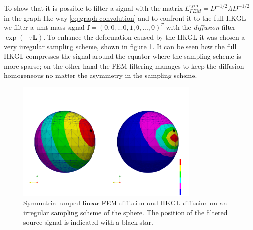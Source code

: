 To show that it is possible to filter a signal with the matrix $L_{FEM}^{\text{sym}} = D^{-1/2}AD^{-1/2}$ in the graph-like way \ref{eq:graph convolution} and to confront it to the full HKGL we filter a unit mass signal $\mathbf{f}=(0,0,...0,1,0,...,0)^T$ with the \textit{diffusion} filter $\exp{(-\tau \mathbf L)}$. To enhance the deformation caused by the HKGL it was chosen a very irregular sampling scheme, shown in figure \ref{fig:FEM lumped symmetric diffusion on irregular sampling}. It can be seen how the full HKGL compresses the signal around the equator where the sampling scheme is more sparse; on the other hand the FEM filtering manages to keep the diffusion homogeneous no matter the asymmetry in the sampling scheme. 
\begin{figure}[h!]
	\centering
	\includegraphics[width=0.8\textwidth]{figs/Chapter3/diffusion.png}
	\caption{\label{fig:FEM lumped symmetric diffusion on irregular sampling}Symmetric lumped linear FEM diffusion and HKGL diffusion on an irregular sampling scheme of the sphere. The position of the filtered source signal is indicated with a black star.}
\end{figure}
\clearpage






